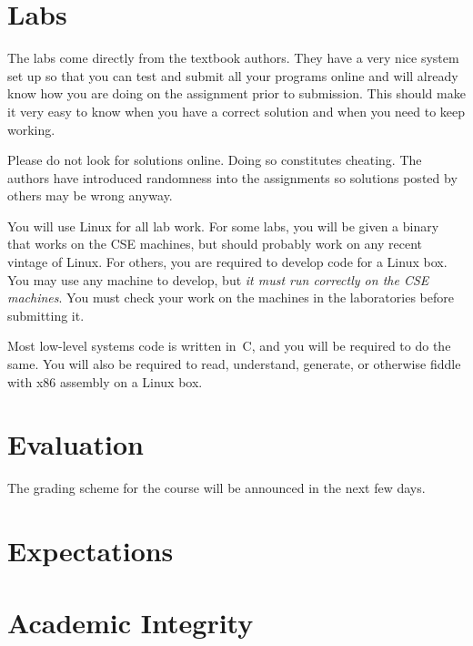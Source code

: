 \documentclass[11pt]{article}
\begin{document}
\section{Labs}

The labs come directly from the textbook authors.
They have a very nice system set up so that you can test and submit
all your programs online and will
already know how you are doing on the assignment prior to submission.
This should make it very easy to know when you have a correct solution
and when you need to keep working.

Please do not look for solutions online.
Doing so constitutes cheating.
The authors have introduced randomness into the assignments
so solutions posted by others may be wrong anyway.

You will use Linux for all lab work.
For some labs, you will be given a binary
that works on the CSE machines,
but should probably work on any recent vintage of Linux.
For others, you are required to develop code for a Linux box.
You may use any machine to develop,
but \emph{it must run correctly on the CSE machines}.
You must check your work on the machines in the laboratories
before submitting it.

Most low-level systems code is written in~C,
and you will be required to do the same.
You will also be required to read, understand, generate,
or otherwise fiddle with x86 assembly on a Linux box.

\section{Evaluation}

The grading scheme for the course will be announced in the next few days.

\section{Expectations}



\section{Academic Integrity}



\printbibliography{}
\end{document}
